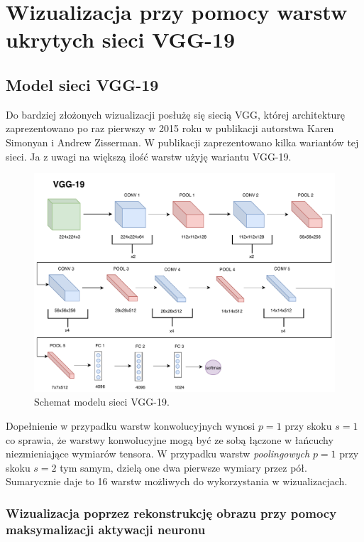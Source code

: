 \chapter{Wizualizacja przy pomocy warstw ukrytych sieci VGG-19}
\label{chap:vgg}
\section{Model sieci VGG-19}
\label{vgg-model}

Do bardziej złożonych wizualizacji posłużę się siecią VGG, której architekturę zaprezentowano po raz pierwszy w 2015 roku w publikacji autorstwa Karen Simonyan i 
Andrew Zisserman\cite{vggpaper}. W publikacji zaprezentowano kilka wariantów tej sieci. Ja z uwagi na większą ilość warstw użyję wariantu VGG-19.

\begin{figure}[ht]
\centerline{\includegraphics[scale=0.5]{resources/vgg/vgg.pdf}}
\caption{Schemat modelu sieci VGG-19.}
\label{fig:vgg19-schemat}
\end{figure}

Dopełnienie w przypadku warstw konwolucyjnych wynosi \(p=1\) przy skoku \(s=1\) co sprawia, że warstwy konwolucyjne mogą być ze sobą łączone w łańcuchy niezmieniające wymiarów tensora. W przypadku warstw \textit{poolingowych} \(p=1\) przy skoku \(s=2\) tym samym, dzielą one dwa pierwsze wymiary przez pół. Sumarycznie daje to 16 warstw możliwych do wykorzystania w wizualizacjach.

\subsection{Wizualizacja poprzez rekonstrukcję obrazu przy pomocy maksymalizacji aktywacji neuronu}
\label{vgg-mean-activation}

